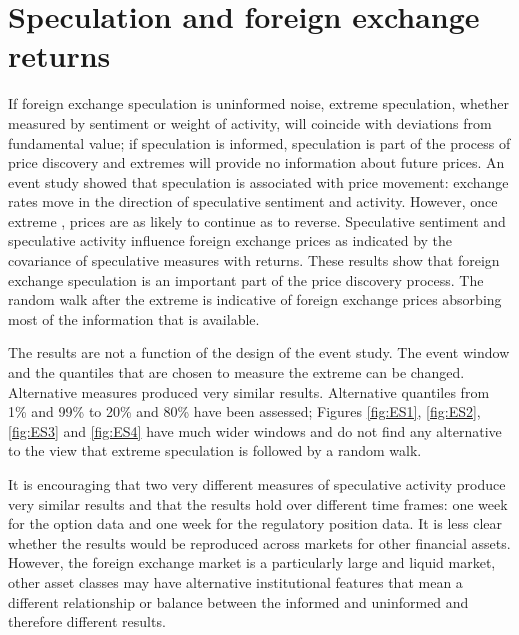 \documentclass[ijfs,article,submit,oneauthor,pdftex,10pt,a4paper]{mdpi}
\begin{document}
\section{Speculation and foreign exchange returns}
If foreign exchange speculation is uninformed noise, extreme speculation, whether measured by sentiment or weight of activity, will coincide with deviations from fundamental value; if speculation is informed, speculation is part of the process of price discovery and extremes will provide no information about future prices. An event study showed that speculation is associated with price movement: exchange rates move in the direction of speculative sentiment and activity.  However, once extreme , prices are as likely to continue as to reverse. Speculative sentiment and speculative activity influence foreign exchange prices as indicated by the covariance of speculative measures with returns.  These results show that foreign exchange speculation is an important part of the price discovery process.  The random walk after the extreme is indicative of foreign exchange prices absorbing most of the information that is available.  
  
The results are not a function of the design of the event study.  The event window and the quantiles that are chosen to measure the extreme can be changed.  Alternative measures produced very similar results. Alternative quantiles from 1\% and 99\% to 20\% and 80\% have been assessed; Figures \ref{fig:ES1}, \ref{fig:ES2}, \ref{fig:ES3} and \ref{fig:ES4} have much wider windows and do not find any alternative to the view that extreme speculation is followed by a random walk. 

It is encouraging that two very different measures of speculative activity produce very similar results and that the results hold over different time frames: one week for the option data and one week for the regulatory position data.  It is less clear whether the results would be reproduced across markets for other financial assets.    However, the foreign exchange market is a particularly large and liquid market, other asset classes may have alternative institutional features that mean a different relationship or balance between the informed and uninformed and therefore different results.  
\end{document}

